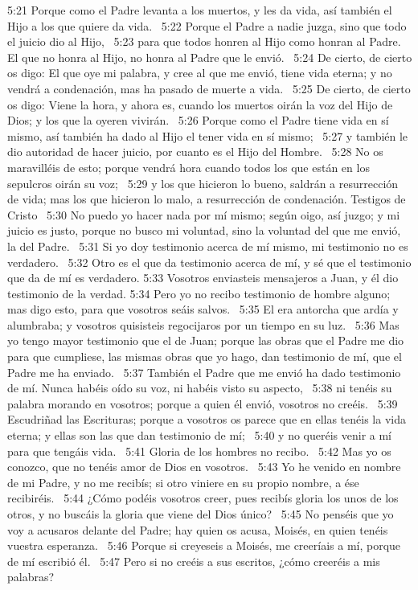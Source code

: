 5:21 Porque como el Padre levanta a los muertos, y les da vida, así también el Hijo a los que quiere da vida.  
5:22 Porque el Padre a nadie juzga, sino que todo el juicio dio al Hijo,  
5:23 para que todos honren al Hijo como honran al Padre. El que no honra al Hijo, no honra al Padre que le envió.  
5:24 De cierto, de cierto os digo: El que oye mi palabra, y cree al que me envió, tiene vida eterna; y no vendrá a condenación, mas ha pasado de muerte a vida.  
5:25 De cierto, de cierto os digo: Viene la hora, y ahora es, cuando los muertos oirán la voz del Hijo de Dios; y los que la oyeren vivirán.  
5:26 Porque como el Padre tiene vida en sí mismo, así también ha dado al Hijo el tener vida en sí mismo;  
5:27 y también le dio autoridad de hacer juicio, por cuanto es el Hijo del Hombre.  
5:28 No os maravilléis de esto; porque vendrá hora cuando todos los que están en los sepulcros oirán su voz;  
5:29 y los que hicieron lo bueno, saldrán a resurrección de vida; mas los que hicieron lo malo, a resurrección de condenación. 
Testigos de Cristo  
5:30 No puedo yo hacer nada por mí mismo; según oigo, así juzgo; y mi juicio es justo, porque no busco mi voluntad, sino la voluntad del que me envió, la del Padre.  
5:31 Si yo doy testimonio acerca de mí mismo, mi testimonio no es verdadero.  
5:32 Otro es el que da testimonio acerca de mí, y sé que el testimonio que da de mí es verdadero. 
5:33 Vosotros enviasteis mensajeros a Juan, y él dio testimonio de la verdad. 
5:34 Pero yo no recibo testimonio de hombre alguno; mas digo esto, para que vosotros seáis salvos.  
5:35 El era antorcha que ardía y alumbraba; y vosotros quisisteis regocijaros por un tiempo en su luz.  
5:36 Mas yo tengo mayor testimonio que el de Juan; porque las obras que el Padre me dio para que cumpliese, las mismas obras que yo hago, dan testimonio de mí, que el Padre me ha enviado.  
5:37 También el Padre que me envió ha dado testimonio de mí. Nunca habéis oído su voz, ni habéis visto su aspecto,  
5:38 ni tenéis su palabra morando en vosotros; porque a quien él envió, vosotros no creéis.  
5:39 Escudriñad las Escrituras; porque a vosotros os parece que en ellas tenéis la vida eterna; y ellas son las que dan testimonio de mí;  
5:40 y no queréis venir a mí para que tengáis vida.  
5:41 Gloria de los hombres no recibo.  
5:42 Mas yo os conozco, que no tenéis amor de Dios en vosotros.  
5:43 Yo he venido en nombre de mi Padre, y no me recibís; si otro viniere en su propio nombre, a ése recibiréis.  
5:44 ¿Cómo podéis vosotros creer, pues recibís gloria los unos de los otros, y no buscáis la gloria que viene del Dios único?  
5:45 No penséis que yo voy a acusaros delante del Padre; hay quien os acusa, Moisés, en quien tenéis vuestra esperanza.  
5:46 Porque si creyeseis a Moisés, me creeríais a mí, porque de mí escribió él.  
5:47 Pero si no creéis a sus escritos, ¿cómo creeréis a mis palabras?  

